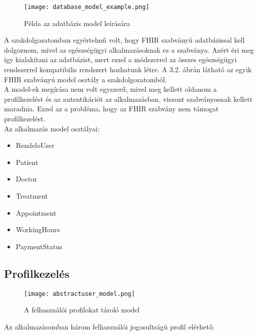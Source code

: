 \begin{figure}[H]
	\caption{Példa az adatbázis model leírására}
	\label{fig:adatbazismodell}
	\centering
	\texttt{[image: database\_model\_example.png]}
\end{figure}

A szakdolgozatomban egyértelmű volt, hogy FHIR szabványú adatbázissal kell dolgoznom, mivel az egészségügyi alkalmazásoknak ez a szabványa. Azért éri meg így kialakítani az adatbázist, mert ezzel a módszerrel az összes egészségügyi rendszerrel kompatibilis rendszert hozhatunk létre. A 3.2. ábrán látható az egyik FHIR szabványú model osztály a szakdolgozatomból.\\
A model-ek megírása nem volt egyszerű, mivel meg kellett oldanom a profilkezelést és az autentikációt az alkalmazásban, viszont szabványosnak kellett maradnia. Ezzel az a probléma, hogy az FHIR szabvány nem támogat profilkezelést.\\
Az alkalmazás model osztályai:
\begin{itemize}
	\item RendeloUser
	\item Patient
	\item Doctor
	\item Treatment
	\item Appointment
	\item WorkingHours
	\item PaymentStatus
\end{itemize}

\subsection{Profilkezelés}

\begin{figure}[H]
	\caption{A felhasználói profilokat tároló model}
	\label{fig:profilmodell}
	\centering
	\texttt{[image: abstractuser\_model.png]}
\end{figure}

Az alkalmazásomban három felhasználói jogosultságú profil elérhető:

